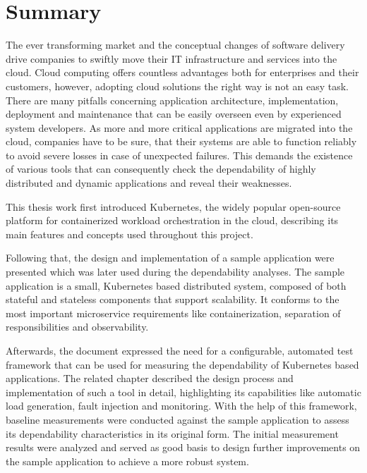 \chapter{Summary}

The ever transforming market and the conceptual changes of software delivery drive companies to swiftly move their IT infrastructure and services into the cloud. Cloud computing offers countless advantages both for enterprises and their customers, however, adopting cloud solutions the right way is not an easy task. There are many pitfalls concerning application architecture, implementation, deployment and maintenance that can be easily overseen even by experienced system developers. As more and more critical applications are migrated into the cloud, companies have to be sure, that their systems are able to function reliably to avoid severe losses in case of unexpected failures. This demands the existence of various tools that can consequently check the dependability of highly distributed and dynamic applications and reveal their weaknesses.

This thesis work first introduced Kubernetes, the widely popular open-source platform for containerized workload orchestration in the cloud, describing its main features and concepts used throughout this project.

Following that, the design and implementation of a sample application were presented which was later used during the dependability analyses. The sample application is a small, Kubernetes based distributed system, composed of both stateful and stateless components that support scalability. It conforms to the most important microservice requirements like containerization, separation of responsibilities and observability.

Afterwards, the document expressed the need for a configurable, automated test framework that can be used for measuring the dependability of Kubernetes based applications. The related chapter described the design process and implementation of such a tool in detail, highlighting its capabilities like automatic load generation, fault injection and monitoring. With the help of this framework, baseline measurements were conducted against the sample application to assess its dependability characteristics in its original form. The initial measurement results were analyzed and served as good basis to design further improvements on the sample application to achieve a more robust system.

